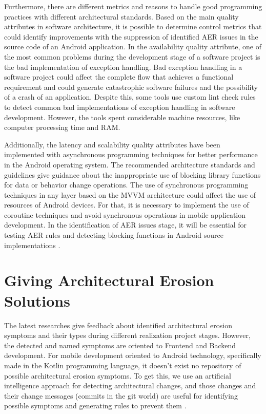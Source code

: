 Furthermore, there are different metrics and reasons to handle good programming practices with different architectural standards. Based on the main quality attributes in software architecture, it is possible to determine control metrics that could identify improvements with the suppression of identified AER issues in the source code of an Android application.
In the availability quality attribute, one of the most common problems during the development stage of a software project is the bad implementation of exception handling. Bad exception handling in a software project could affect the complete flow that achieves a functional requirement and could generate catastrophic software failures and the possibility of a crash of an application. Despite this, some tools use custom lint check rules to detect common bad implementations of exception handling in software development. However, the tools spent considerable machine resources, like computer processing time and RAM. \cite{handle-exceptions-reference}

Additionally, the latency and scalability quality attributes have been implemented with asynchronous programming techniques for better performance in the Android operating system. The recommended architecture standards and guidelines give guidance about the inappropriate use of blocking library functions for data or behavior change operations. The use of synchronous programming techniques in any layer based on the MVVM architecture could affect the use of resources of Android devices. For that, it is necessary to implement the use of coroutine techniques and avoid synchronous operations in mobile application development. In the identification of AER issues stage, it will be essential for testing AER rules and detecting blocking functions in Android source implementations \cite{performance-coroutines-reference}.


\section{Giving Architectural Erosion Solutions}
The latest researches give feedback about identified architectural erosion symptoms and their types during different realization project stages. However, the detected and named symptoms are oriented to Frontend and Backend development. For mobile development oriented to Android technology, specifically made in the Kotlin programming language, it doesn't exist no repository of possible architectural erosion symptoms. To get this, we use an artificial intelligence approach for detecting architectural changes, and those changes and their change messages (commits in the git world) are useful for identifying possible symptoms and generating rules to prevent them \cite{aer-metrics-paper}.


